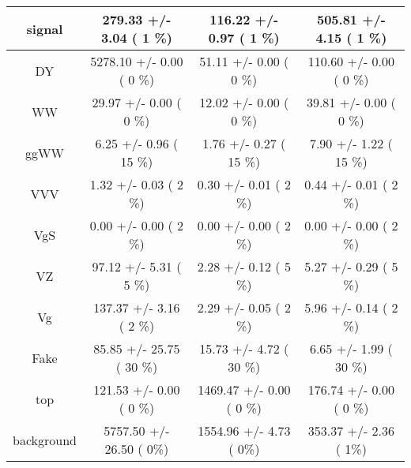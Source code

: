 \begin{table}[h!]\begin{center}
\footnotesize{\begin{tabular}{
c| c | c | c | } \hline
\hline


        signal   &     279.33 +/-       3.04 (         1 \%)   &     116.22 +/-       0.97 (         1 \%)   &     505.81 +/-       4.15 (         1 \%)  \\
\hline
            DY   &    5278.10 +/-       0.00 (         0 \%)   &      51.11 +/-       0.00 (         0 \%)   &     110.60 +/-       0.00 (         0 \%)  \\
            WW   &      29.97 +/-       0.00 (         0 \%)   &      12.02 +/-       0.00 (         0 \%)   &      39.81 +/-       0.00 (         0 \%)  \\
          ggWW   &       6.25 +/-       0.96 (        15 \%)   &       1.76 +/-       0.27 (        15 \%)   &       7.90 +/-       1.22 (        15 \%)  \\
           VVV   &       1.32 +/-       0.03 (         2 \%)   &       0.30 +/-       0.01 (         2 \%)   &       0.44 +/-       0.01 (         2 \%)  \\
           VgS   &       0.00 +/-       0.00 (         2 \%)   &       0.00 +/-       0.00 (         2 \%)   &       0.00 +/-       0.00 (         2 \%)  \\
            VZ   &      97.12 +/-       5.31 (         5 \%)   &       2.28 +/-       0.12 (         5 \%)   &       5.27 +/-       0.29 (         5 \%)  \\
            Vg   &     137.37 +/-       3.16 (         2 \%)   &       2.29 +/-       0.05 (         2 \%)   &       5.96 +/-       0.14 (         2 \%)  \\
          Fake   &      85.85 +/-      25.75 (        30 \%)   &      15.73 +/-       4.72 (        30 \%)   &       6.65 +/-       1.99 (        30 \%)  \\
           top   &     121.53 +/-       0.00 (         0 \%)   &    1469.47 +/-       0.00 (         0 \%)   &     176.74 +/-       0.00 (         0 \%)  \\
\hline
    background   &    5757.50 +/-      26.50 (         0\%)   &    1554.96 +/-       4.73 (         0\%)   &     353.37 +/-       2.36 (         1\%)  \\
\hline
\end{tabular}
}
\end{center}




\end{table}
